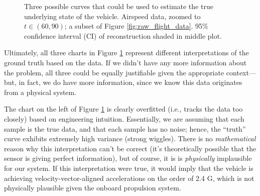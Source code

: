 \documentclass[conf]{new-aiaa}
\begin{document}
    \begin{figure}[H]
        \centering
        \caption{Three possible curves that could be used to estimate the true underlying state of the vehicle. Airspeed data, zoomed to $t \in (60, 90)$; a subset of Figure \ref{fig:raw_flight_data}. 95\% confidence interval (CI) of reconstruction shaded in middle plot.}
        \label{fig:under_over_fitting}
    \end{figure}

    Ultimately, all three charts in Figure \ref{fig:under_over_fitting} represent different interpretations of the ground truth based on the data. If we didn't have any more information about the problem, all three could be equally justifiable given the appropriate context—but, in fact, we do have more information, since we know this data originates from a physical system.

    The chart on the left of Figure \ref{fig:under_over_fitting} is clearly overfitted (i.e., tracks the data too closely) based on engineering intuition. Essentially, we are assuming that each sample is the true data, and that each sample has no noise; hence, the ``truth'' curve exhibits extremely high variance (strong wiggles). There is no \emph{mathematical} reason why this interpretation can't be correct (it's theoretically possible that the sensor is giving perfect information), but of course, it is is \emph{physically} implausible for our system. If this interpretation were true, it would imply that the vehicle is achieving velocity-vector-aligned accelerations on the order of 2.4 G, which is not physically plausible given the onboard propulsion system.
\end{document}
